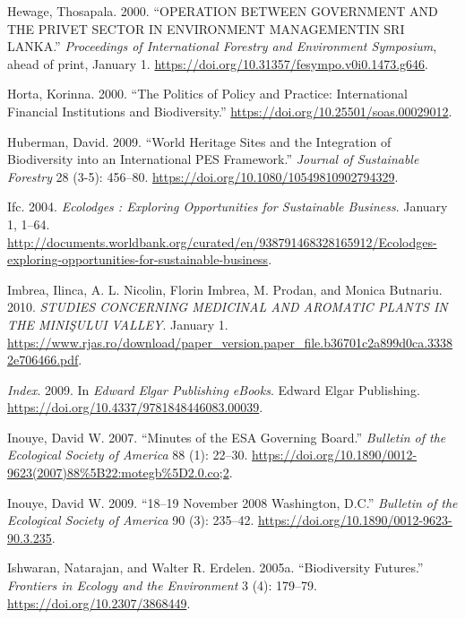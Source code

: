 \begin{CSLReferences}{1}{1}
Hewage, Thosapala. 2000. {``OPERATION BETWEEN GOVERNMENT AND THE PRIVET
SECTOR IN ENVIRONMENT MANAGEMENTIN SRI LANKA.''} \emph{Proceedings of
International Forestry and Environment Symposium}, ahead of print,
January 1. \url{https://doi.org/10.31357/fesympo.v0i0.1473.g646}.

Horta, Korinna. 2000. {``The Politics of Policy and Practice:
International Financial Institutions and Biodiversity.''}
\url{https://doi.org/10.25501/soas.00029012}.

Huberman, David. 2009. {``World Heritage Sites and the Integration of
Biodiversity into an International PES Framework.''} \emph{Journal of
Sustainable Forestry} 28 (3-5): 456--80.
\url{https://doi.org/10.1080/10549810902794329}.

Ifc. 2004. \emph{Ecolodges : Exploring Opportunities for Sustainable
Business}. January 1, 1--64.
\url{http://documents.worldbank.org/curated/en/938791468328165912/Ecolodges-exploring-opportunities-for-sustainable-business}.

Imbrea, Ilinca, A. L. Nicolin, Florin Imbrea, M. Prodan, and Monica
Butnariu. 2010. \emph{STUDIES CONCERNING MEDICINAL AND AROMATIC PLANTS
IN THE MINIŞULUI VALLEY}. January 1.
\url{https://www.rjas.ro/download/paper_version.paper_file.b36701c2a899d0ca.33382e706466.pdf}.

\emph{Index}. 2009. In \emph{Edward Elgar Publishing eBooks}. Edward
Elgar Publishing. \url{https://doi.org/10.4337/9781848446083.00039}.

Inouye, David W. 2007. {``Minutes of the ESA Governing Board.''}
\emph{Bulletin of the Ecological Society of America} 88 (1): 22--30.
\url{https://doi.org/10.1890/0012-9623(2007)88\%5B22:motegb\%5D2.0.co;2}.

Inouye, David W. 2009. {``18--19 November 2008 Washington, D.C.''}
\emph{Bulletin of the Ecological Society of America} 90 (3): 235--42.
\url{https://doi.org/10.1890/0012-9623-90.3.235}.

Ishwaran, Natarajan, and Walter R. Erdelen. 2005a. {``Biodiversity
Futures.''} \emph{Frontiers in Ecology and the Environment} 3 (4):
179--79. \url{https://doi.org/10.2307/3868449}.


\end{CSLReferences}
